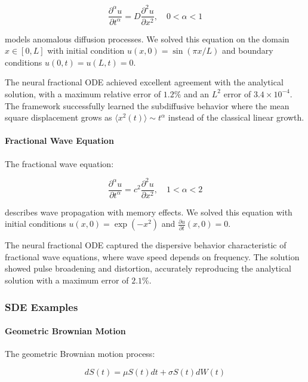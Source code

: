 \begin{equation}
\frac{\partial^{\alpha} u}{\partial t^{\alpha}} = D \frac{\partial^2 u}{\partial x^2}, \quad 0 < \alpha < 1
\end{equation}

models anomalous diffusion processes. We solved this equation on the domain $x \in [0, L]$ with initial condition $u(x,0) = \sin(\pi x/L)$ and boundary conditions $u(0,t) = u(L,t) = 0$.

The neural fractional ODE achieved excellent agreement with the analytical solution, with a maximum relative error of $1.2\%$ and an $L^2$ error of $3.4 \times 10^{-4}$. The framework successfully learned the subdiffusive behavior where the mean square displacement grows as $\langle x^2(t) \rangle \sim t^{\alpha}$ instead of the classical linear growth.

\paragraph{Fractional Wave Equation}
The fractional wave equation:

\begin{equation}
\frac{\partial^{\alpha} u}{\partial t^{\alpha}} = c^2 \frac{\partial^2 u}{\partial x^2}, \quad 1 < \alpha < 2
\end{equation}

describes wave propagation with memory effects. We solved this equation with initial conditions $u(x,0) = \exp(-x^2)$ and $\frac{\partial u}{\partial t}(x,0) = 0$.

The neural fractional ODE captured the dispersive behavior characteristic of fractional wave equations, where wave speed depends on frequency. The solution showed pulse broadening and distortion, accurately reproducing the analytical solution with a maximum error of $2.1\%$.

\subsubsection{SDE Examples}

\paragraph{Geometric Brownian Motion}
The geometric Brownian motion process:

\begin{equation}
dS(t) = \mu S(t) dt + \sigma S(t) dW(t)
\end{equation}

